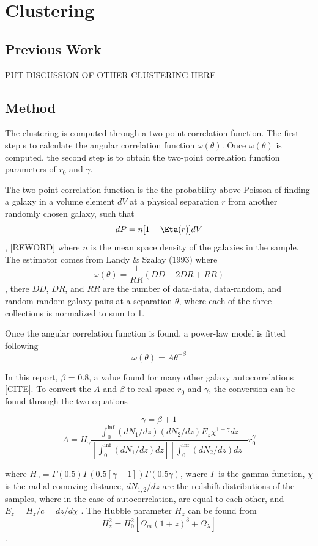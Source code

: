\chapter{Clustering}

\section{Previous Work}

PUT DISCUSSION OF OTHER CLUSTERING HERE

\section{Method}

The clustering is computed through a two point correlation function. The first step s to calculate the angular correlation function $ \omega(\theta)$. Once $ \omega(\theta)$ is computed, the second step is to obtain the two-point correlation function parameters of $r_0$ and $\gamma$.

The two-point correlation function is the the probability above Poisson of finding a galaxy in a volume element $dV$ at a physical separation $r$ from another randomly chosen galaxy, such that $$ dP = n[1 + \Eta(r)]dV$$, [REWORD] where $n$ is the mean space density of the galaxies in the sample. The estimator comes from Landy \& Szalay (1993) where $$ \omega(\theta) = \frac{1}{RR}(DD-2DR + RR)$$, there $DD$, $DR$, and $RR$ are the number of data-data, data-random, and random-random galaxy pairs at a separation $\theta$, where each of the three collections is normalized to sum to 1. 

Once the angular correlation function is found, a power-law model is fitted following $$\omega(\theta) = A\theta^{-\beta} $$

In this report, $\beta$ = 0.8, a value found for many other galaxy autocorrelations [CITE]. To convert the $A$ and $\beta$ to real-space $r_0$ and $\gamma$, the conversion can be found through the two equations

$$ \gamma = \beta + 1 $$ $$ A = H_{\gamma}\frac{\int_{0}^{\inf} (dN_1/dz)(dN_2/dz)E_z\chi^{1 - \gamma} dz}{[\int_{0}^{\inf} (dN_1/dz)dz][\int_{0}^{\inf} (dN_2/dz)dz]}r_0^{\gamma}$$

where $H_{\gamma} = \Gamma(0.5)\Gamma(0.5[\gamma -1])\Gamma(0.5\gamma)$, where $\Gamma$ is the gamma function, $\chi$ is the radial comoving distance, $dN_{1,2}/dz$ are the redshift distributions of the samples, where in the case of autocorrelation, are equal to each other, and $E_z = H_z/c = dz/d\chi$ \cite{hickox2011clustering}. The Hubble parameter $H_z$ can be found from
$$H_z^2 = H_0^2[\Omega_m(1+z)^3 + \Omega_{\lambda}]$$ \cite{hickox2011clustering}.

